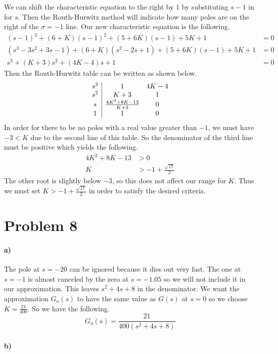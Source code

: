 \documentclass[12pt]{article}
\begin{document}
We can shift the characteristic equation to the right by 1 by substituting \(s-1\) in for \(s\). Then the Routh-Hurwitz method
will indicate how many poles are on the right of the \(\sigma=-1\) line. Our new characteristic equation is the following.
\begin{align*}
    (s-1)^3+(6+K)(s-1)^2+(5+6K)(s-1)+5K+1&=0\\
    (s^3-3s^2+3s-1)+(6+K)(s^2-2s+1)+(5+6K)(s-1)+5K+1&=0\\
    s^3 +(K+3)s^2 + (4K-4)s +1 &=0
\end{align*}
Then the Routh-Hurwitz table can be written as shown below.
\[\begin{array}{c|c c}
    s^3 & 1 & 4K-4\\
    s^2 & K+3 & 1\\
    s & \frac{4K^2+8K-13}{K+3} & 0\\
    1 & 1 & 0
\end{array}\]
In order for there to be no poles with a real value greater than \(-1\), we must have \(-3<K\) due to the second line of this table.
So the denominator of the third line must be positive which yields the following.
\begin{align*}
    4K^2+8K-13&>0\\
    K&>-1+\frac{\sqrt{17}}{2}
\end{align*}
The other root is slightly below \(-3\), so this does not affect our range for \(K\). Thus we must set \(K>-1+\frac{\sqrt{17}}{2}\)
in order to satisfy the desired criteria.

\section*{Problem 8}

\paragraph{a)}

The pole at \(s=-20\) can be ignored because it dies out very fast. The one at \(s=-1\) is almost canceled by the zero at \(s=-1.05\) so
we will not include it in our approximation. This leaves \(s^2+4s+8\) in the denominator. We want the approximation \(G_a(s)\) to have
the same value as \(G(s)\) at \(s=0\) so we choose \(K=\frac{21}{400}\). So we have the following.
\[G_a(s)=\frac{21}{400(s^2+4s+8)}\]

\paragraph{b)}
\end{document}
